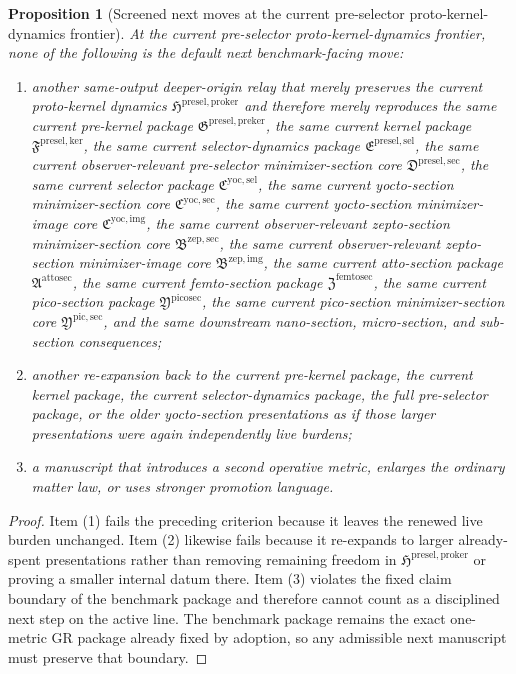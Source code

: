 \documentclass[11pt]{article}
\newcommand{\ProtoKernelPackage}{\mathfrak H^{\mathrm{presel,proker}}}
\newcommand{\PreKernelPackage}{\mathfrak G^{\mathrm{presel,preker}}}
\newcommand{\KernelPackage}{\mathfrak F^{\mathrm{presel,ker}}}
\newcommand{\PreSectionSelectorPackage}{\mathfrak E^{\mathrm{presel,sel}}}
\newcommand{\PreSelectorMinSectionCore}{\mathfrak D^{\mathrm{presel,sec}}}
\newcommand{\YoctoSelectorPackage}{\mathfrak C^{\mathrm{yoc,sel}}}
\newcommand{\YoctoImageCore}{\mathfrak C^{\mathrm{yoc,img}}}
\newcommand{\YoctoMinSectionCore}{\mathfrak C^{\mathrm{yoc,sec}}}
\newcommand{\ZeptoImageCore}{\mathfrak B^{\mathrm{zep,img}}}
\newcommand{\ZeptoMinSectionCore}{\mathfrak B^{\mathrm{zep,sec}}}
\newcommand{\AttoSectionPackage}{\mathfrak A^{\mathrm{attosec}}}
\newcommand{\FemtoSectionPackage}{\mathfrak Z^{\mathrm{femtosec}}}
\newcommand{\PicoSectionPackage}{\mathfrak Y^{\mathrm{picosec}}}
\newcommand{\PicoMinSectionCore}{\mathfrak Y^{\mathrm{pic,sec}}}
\newtheorem{proposition}{Proposition}
\begin{document}
\begin{proposition}[Screened next moves at the current pre-selector proto-kernel-dynamics frontier]
At the current pre-selector proto-kernel-dynamics frontier, none of the following is the default next benchmark-facing move:
\begin{enumerate}
    \item another same-output deeper-origin relay that merely preserves the current proto-kernel dynamics \(\ProtoKernelPackage\) and therefore merely reproduces the same current pre-kernel package \(\PreKernelPackage\), the same current kernel package \(\KernelPackage\), the same current selector-dynamics package \(\PreSectionSelectorPackage\), the same current observer-relevant pre-selector minimizer-section core \(\PreSelectorMinSectionCore\), the same current selector package \(\YoctoSelectorPackage\), the same current yocto-section minimizer-section core \(\YoctoMinSectionCore\), the same current yocto-section minimizer-image core \(\YoctoImageCore\), the same current observer-relevant zepto-section minimizer-section core \(\ZeptoMinSectionCore\), the same current observer-relevant zepto-section minimizer-image core \(\ZeptoImageCore\), the same current atto-section package \(\AttoSectionPackage\), the same current femto-section package \(\FemtoSectionPackage\), the same current pico-section package \(\PicoSectionPackage\), the same current pico-section minimizer-section core \(\PicoMinSectionCore\), and the same downstream nano-section, micro-section, and sub-section consequences;
    \item another re-expansion back to the current pre-kernel package, the current kernel package, the current selector-dynamics package, the full pre-selector package, or the older yocto-section presentations as if those larger presentations were again independently live burdens;
    \item a manuscript that introduces a second operative metric, enlarges the ordinary matter law, or uses stronger promotion language.
\end{enumerate}
\end{proposition}

\begin{proof}
Item (1) fails the preceding criterion because it leaves the renewed live burden unchanged. Item (2) likewise fails because it re-expands to larger already-spent presentations rather than removing remaining freedom in \(\ProtoKernelPackage\) or proving a smaller internal datum there. Item (3) violates the fixed claim boundary of the benchmark package and therefore cannot count as a disciplined next step on the active line. The benchmark package remains the exact one-metric GR package already fixed by adoption, so any admissible next manuscript must preserve that boundary.
\end{proof}
\end{document}
